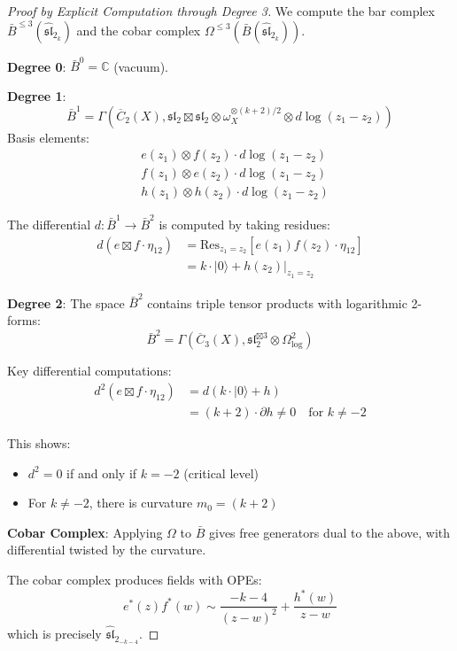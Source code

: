 \begin{proof}[Proof by Explicit Computation through Degree 3]
We compute the bar complex $\bar{B}^{\leq 3}(\widehat{\mathfrak{sl}}_2_k)$ and the cobar complex $\Omega^{\leq 3}(\bar{B}(\widehat{\mathfrak{sl}}_2_k))$.

\textbf{Degree 0}: $\bar{B}^0 = \mathbb{C}$ (vacuum).

\textbf{Degree 1}: 
\begin{equation}
\bar{B}^1 = \Gamma(\overline{C}_2(X), \mathfrak{sl}_2 \boxtimes \mathfrak{sl}_2 \otimes \omega_X^{\otimes(k+2)/2} \otimes d\log(z_1-z_2))
\end{equation}
Basis elements:
\begin{align}
&e(z_1) \otimes f(z_2) \cdot d\log(z_1-z_2) \\
&f(z_1) \otimes e(z_2) \cdot d\log(z_1-z_2) \\
&h(z_1) \otimes h(z_2) \cdot d\log(z_1-z_2)
\end{align}

The differential $d: \bar{B}^1 \to \bar{B}^2$ is computed by taking residues:
\begin{align}
d(e \boxtimes f \cdot \eta_{12}) &= \mathrm{Res}_{z_1=z_2}[e(z_1)f(z_2) \cdot \eta_{12}] \\
&= k \cdot |0\rangle + h(z_2)|_{z_1=z_2}
\end{align}

\textbf{Degree 2}:
The space $\bar{B}^2$ contains triple tensor products with logarithmic 2-forms:
\begin{equation}
\bar{B}^2 = \Gamma(\overline{C}_3(X), \mathfrak{sl}_2^{\boxtimes 3} \otimes \Omega^2_{\log})
\end{equation}

Key differential computations:
\begin{align}
d^2(e \boxtimes f \cdot \eta_{12}) &= d(k \cdot |0\rangle + h) \\
&= (k+2) \cdot \partial h \neq 0 \quad \text{for } k \neq -2
\end{align}

This shows:
\begin{itemize}
\item $d^2 = 0$ if and only if $k = -2$ (critical level)
\item For $k \neq -2$, there is curvature $m_0 = (k+2)$
\end{itemize}

\textbf{Cobar Complex}: Applying $\Omega$ to $\bar{B}$ gives free generators dual to the above, with differential twisted by the curvature.

The cobar complex produces fields with OPEs:
\begin{equation}
e^*(z) f^*(w) \sim \frac{-k-4}{(z-w)^2} + \frac{h^*(w)}{z-w}
\end{equation}
which is precisely $\widehat{\mathfrak{sl}}_2_{-k-4}$.
\end{proof}

